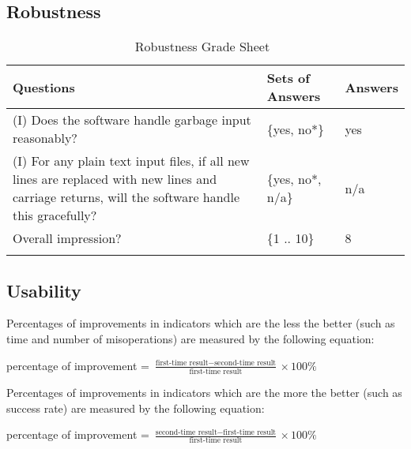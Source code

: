 \documentclass[12pt, titlepage]{article}
\begin{document}
\subsection{Robustness}

\begin{longtable}{p{10cm} l l}
\toprule
Questions & Sets of Answers & Answers\\
\midrule

(I) Does the software handle garbage input reasonably? & \{yes, no*\} & yes\\
(I) For any plain text input files, if all new lines are replaced with new
lines and carriage returns, will the software handle this gracefully? & \{yes,
no*,
n/a\} & n/a\\
Overall impression? & \{1 .. 10\} & 8\\
\bottomrule
\caption{Robustness Grade Sheet~\cite{SmithEtAl2018}}
\label{Tb_robustness}
\end{longtable}

\subsection{Usability}

Percentages of improvements in indicators which are the less the better (such
as time and number of misoperations) are measured by the following equation:

percentage of improvement = $\frac{\text{first-time result} - \text{second-time
result}}{\text{first-time result}} \times 100\%$

Percentages of improvements in indicators which are the more the better (such
as success rate) are measured by the following equation:

percentage of improvement = $\frac{\text{second-time result} - \text{first-time
result}}{\text{first-time result}} \times 100\%$
\end{document}
